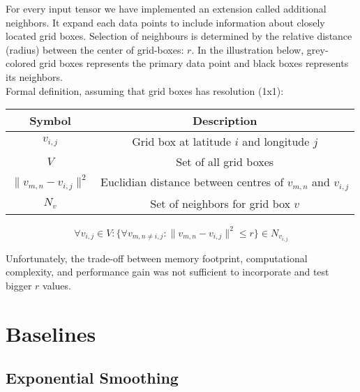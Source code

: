 \noindent For every input tensor we have implemented an extension called additional neighbors. It expand each data points to include information about closely located grid boxes. Selection of neighbours is determined by the relative distance (radius) between the center of grid-boxes: $r$. In the illustration below, grey-colored grid boxes represents the primary data point and black boxes represents its neighbors. \\



\noindent Formal definition, assuming that grid boxes has resolution (1x1):
\begin{table}[!h]
    \centering
    \begin{tabular}{|c|c|}
        \hline
        Symbol & Description \\
        \hline
        $v_{i,j}$ & Grid box at latitude $i$ and longitude $j$ \\
        $V$  & Set of all grid boxes \\
        $\|v_{m,n} - v_{i,j}\|^2$  & Euclidian distance between centres of $v_{m,n}$ and $v_{i,j}$ \\
        $N_v$ & Set of neighbors for grid box $v$ \\
        \hline
    \end{tabular}
\end{table}
\[
    \forall v_{i,j} \in V: \{\forall v_{m,n \neq i,j} : \|v_{m,n} - v_{i,j}\|^2 \le r\} \in N_{v_{i,j}}
\]

\noindent Unfortunately, the trade-off between memory footprint, computational complexity, and performance gain was not sufficient to incorporate and test bigger $r$ values.

 
 \section{Baselines}
 \subsection{Exponential Smoothing}
